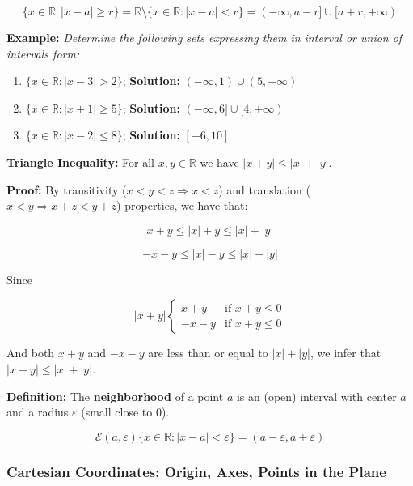 \documentclass[11pt]{article}
\providecommand{\tightlist}{%
      \setlength{\itemsep}{0pt}\setlength{\parskip}{0pt}}
\begin{document}
\[
\{x\in\mathbb{R} : \lvert x-a \rvert \geq r\} = \mathbb{R}\setminus\{x\in\mathbb{R}: \lvert x-a \rvert < r\} = (-\infty,a-r]\cup[a+r,+\infty)
\]

\textbf{Example:} \emph{Determine the following sets expressing them in
interval or union of intervals form:}

\begin{enumerate}
\def\labelenumi{\arabic{enumi}.}
\tightlist
\item
  \(\{x\in\mathbb{R} : \lvert x-3\rvert > 2\}\); \textbf{Solution:}
  \((-\infty,1)\cup(5,+\infty)\)
\item
  \(\{x\in\mathbb{R} : \lvert x+1\rvert \geq 5\}\); \textbf{Solution:}
  \((-\infty,6]\cup[4,+\infty)\)
\item
  \(\{x\in\mathbb{R} : \lvert x-2\rvert \leq 8\}\); \textbf{Solution:}
  \([-6,10]\)
\end{enumerate}

\textbf{Triangle Inequality:} For all \(x,y\in\mathbb{R}\) we have
\(\lvert x+y \rvert \leq \lvert x \rvert + \lvert y \rvert\).

\textbf{Proof:} By transitivity (\(x<y<z\Rightarrow x<z\)) and
translation (\(x<y\Rightarrow x+z < y+z\)) properties, we have that:

\[
x+y \leq \lvert x \rvert + y \leq \lvert x \rvert + \lvert y \rvert
\]

\[
-x-y \leq \lvert x \rvert - y \leq \lvert x \rvert + \lvert y \rvert
\]

Since

\[
\lvert x + y\rvert \begin{cases} 
x + y & \text{if } x+y \leq 0 \\
-x-y  & \text{if } x+y \leq 0
\end{cases}
\]

And both \(x+y\) and \(-x-y\) are less than or equal to
\(\lvert x \rvert + \lvert y \rvert\), we infer that
\(\lvert x + y \rvert \leq \lvert x \rvert + \lvert y \rvert\).

\textbf{Definition:} The \textbf{neighborhood} of a point \(a\) is an
(open) interval with center \(a\) and a radius \(\varepsilon\) (small
close to \(0\)).

\[
\mathcal{E}(a,\varepsilon) \{x\in\mathbb{R} : \lvert x-a\rvert < \varepsilon\} = (a-\varepsilon,a+\varepsilon)
\]

\hypertarget{cartesian-coordinates-origin-axes-points-in-the-plane}{%
\subsubsection{Cartesian Coordinates: Origin, Axes, Points in the
Plane}\label{cartesian-coordinates-origin-axes-points-in-the-plane}}
\end{document}
